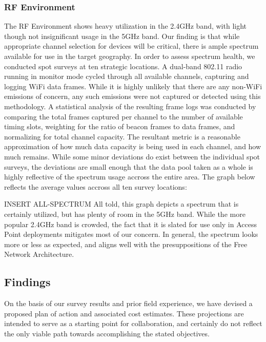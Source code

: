 \subsubsection{RF Environment}
The RF Environment shows heavy utilization in the 2.4GHz band, with light though
not insignificant usage in the 5GHz band. Our finding is that while appropriate
channel selection for devices will be critical, there is ample spectrum
available for use in the target geography. In order to assess spectrum health,
we conducted spot surveys at ten strategic locations. A dual-band 802.11 radio
running in monitor mode cycled through all available channels, capturing and
logging WiFi data frames. While it is highly unlikely that there are any non-WiFi
emissions of concern, any such emissions were not captured or detected using
this methodology. A statistical analysis of the resulting frame logs was conducted
by comparing the total frames captured per channel to the number of available
timing slots, weighting for the ratio of beacon frames to data frames, and
normalizing for total channel capacity. The resultant metric is a reasonable
approximation of how much data capacity is being used in each channel, and how
much remains. While some minor deviations do exist
between the individual spot surveys, the deviations are small enough that the
data pool taken as a whole is highly reflective of the spectrum usage accross
the entire area. The graph below reflects the average values accross all ten
survey locations: \par
INSERT ALL-SPECTRUM
All told, this graph depicts a spectrum that is certainly utilized, but has plenty of room
in the 5GHz band. While the more popular 2.4GHz band is crowded, the fact that
it is slated for use only in Access Point deployments mitigates most of our
concern. In general, the spectrum looks more or less as expected, and aligns
well with the presuppositions of the Free Network Architecture.

\subsection{Findings}
On the basis of our survey results and prior field experience, we have devised
a proposed plan of action and associated cost estimates. These projections are intended
to serve as a starting point for collaboration, and certainly do not reflect the
only viable path towards accomplishing the stated objectives.\par
